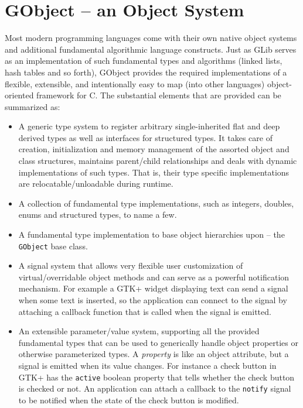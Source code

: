 \documentclass[a4paper,notumble]{leaflet}
\begin{document}
\section{GObject -- an Object System}

Most modern programming languages come with their own native object systems and additional fundamental algorithmic language constructs. Just as GLib serves as an implementation of such fundamental types and algorithms (linked lists, hash tables and so forth), GObject provides the required implementations of a flexible, extensible, and intentionally easy to map (into other languages) object-oriented framework for C. The substantial elements that are provided can be summarized as:
\begin{itemize}
  \item A generic type system to register arbitrary single-inherited flat and deep derived types as well as interfaces for structured types. It takes care of creation, initialization and memory management of the assorted object and class structures, maintains parent/child relationships and deals with dynamic implementations of such types. That is, their type specific implementations are relocatable/unloadable during runtime.

  \item A collection of fundamental type implementations, such as integers, doubles, enums and structured types, to name a few.

  \item A fundamental type implementation to base object hierarchies upon -- the \texttt{GObject} base class.

  \item A signal system that allows very flexible user customization of virtual/overridable object methods and can serve as a powerful notification mechanism. For example a GTK+ widget displaying text can send a signal when some text is inserted, so the application can connect to the signal by attaching a callback function that is called when the signal is emitted.

  \item An extensible parameter/value system, supporting all the provided fundamental types that can be used to generically handle object properties or otherwise parameterized types. A \textit{property} is like an object attribute, but a signal is emitted when its value changes. For instance a check button in GTK+ has the \texttt{active} boolean property that tells whether the check button is checked or not. An application can attach a callback to the \texttt{notify} signal to be notified when the state of the check button is modified.
\end{itemize}
\end{document}
